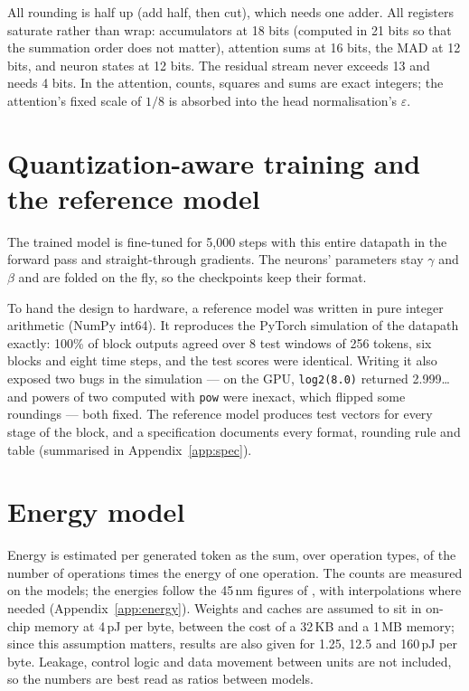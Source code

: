 All rounding is half up (add half, then cut), which needs one adder. All registers saturate rather than wrap:
accumulators at 18 bits (computed in 21 bits so that the summation order does not matter), attention sums at 16
bits, the MAD at 12 bits, and neuron states at 12 bits. The residual stream never exceeds 13 and needs 4 bits. In the
attention, counts, squares and sums are exact integers; the attention's fixed scale of $1/8$ is absorbed into the head
normalisation's $\varepsilon$.

\section{Quantization-aware training and the reference model}

The trained model is fine-tuned for 5{,}000 steps with this entire datapath in the forward pass and straight-through
gradients. The neurons' parameters stay $\gamma$ and $\beta$ and are folded on the fly, so the checkpoints keep their
format.

To hand the design to hardware, a reference model was written in pure integer arithmetic (NumPy int64). It reproduces
the PyTorch simulation of the datapath exactly: 100\% of block outputs agreed over 8 test windows of 256 tokens, six
blocks and eight time steps, and the test scores were identical. Writing it also exposed two bugs in the simulation
--- on the GPU, \texttt{log2(8.0)} returned 2.999\dots{} and powers of two computed with \texttt{pow} were inexact,
which flipped some roundings --- both fixed. The reference model produces test vectors for every stage of the block,
and a specification documents every format, rounding rule and table (summarised in Appendix~\ref{app:spec}).

\section{Energy model}
\label{sec:energymodel}

Energy is estimated per generated token as the sum, over operation types, of the number of operations times the
energy of one operation. The counts are measured on the models; the energies follow the 45\,nm figures of
\citet{horowitz2014energy}, with interpolations where needed (Appendix~\ref{app:energy}). Weights and caches are
assumed to sit in on-chip memory at 4\,pJ per byte, between the cost of a 32\,KB and a 1\,MB memory; since this
assumption matters, results are also given for 1.25, 12.5 and 160\,pJ per byte. Leakage, control logic and data
movement between units are not included, so the numbers are best read as ratios between models.
